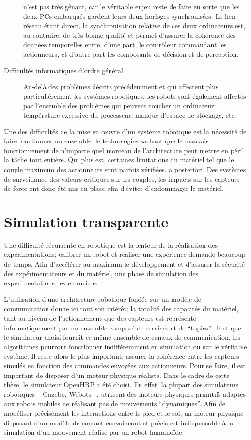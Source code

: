 \begin{description}
  n'est pas très gênant, car le véritable enjeu reste de faire en
  sorte que les deux PCs embarqués gardent leurs deux horloges
  synchronisées. Le lien réseau étant direct, la synchronisation
  relative de ces deux ordinateurs est, au contraire, de très bonne
  qualité et permet d'assurer la cohérence des données temporelles
  entre, d'une part, le contrôleur commandant les actionneurs, et
  d'autre part les composants de décision et de perception.
\item[Difficultés informatiques d'ordre général] Au-delà des problèmes
  décrits précédemment et qui affectent plus particulièrement les
  systèmes robotiques, les robots sont également affectés par
  l'ensemble des problèmes qui peuvent toucher un ordinateur:
  température excessive du processeur, manque d'espace de stockage,
  etc.
\end{description}

Une des difficultés de la mise en \oe uvre d'un système robotique est
la nécessité de faire fonctionner un ensemble de technologies sachant
que le mauvais fonctionnement de n'importe quel morceau de
l'architecture peut mettre en péril la tâche tout entière. Qui plus
est, certaines limitations du matériel tel que le couple maximum des
actionneurs sont parfois vérifiées, a posteriori. Des systèmes de
surveillance des valeurs critiques sur les couples, les impacts sur
les capteurs de force ont donc été mis en place afin d'éviter
d'endommager le matériel.


\section{Simulation transparente}


Une difficulté récurrente en robotique est la lenteur de la
réalisation des expérimentations: calibrer un robot et réaliser une
expérience demande beaucoup de temps. Afin d'accélérer au maximum le
développement et d'assurer la sécurité des expérimentateurs et du
matériel, une phase de simulation des expérimentations reste cruciale.


L'utilisation d'une architecture robotique fondée sur un modèle de
communication donne ici tout son intérêt: la totalité des capacités du
matériel, tant au niveau de l'actionnement que des capteurs est
représenté informatiquement par un ensemble composé de services et de
``topics''. Tant que le simulateur choisi fournit ce même ensemble de
canaux de communication, les algorithmes pourront fonctionner
indifféremment en simulation ou sur le véritable système. Il reste
alors le plus important: assurer la cohérence entre les capteurs
simulés en fonction des commandes envoyées aux actionneurs. Pour se
faire, il est important de disposer d'un moteur physique
réaliste. Dans le cadre de cette thèse, le simulateur
OpenHRP a été choisi. En effet,
la plupart des simulateurs robotiques -- Gazebo, Webots --, utilisent
des moteurs physiques primitifs adaptés aux robots mobiles ne
réalisant pas de mouvements ``dynamiques''. Afin de modéliser
précisément les interactions entre le pied et le sol, un moteur
physique disposant d'un modèle de contact convaincant et précis est
indispensable à la simulation d'un mouvement réalisé par un robot
humanoïde.


